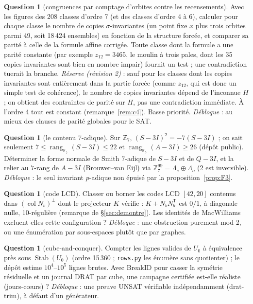 \documentclass[11pt,a4paper]{article}
\theoremstyle{definition}
\newtheorem{question}[theorem]{Question}
\theoremstyle{remark}
\newcommand{\F}{\mathbb{F}}
\newcommand{\Z}{\mathbb{Z}}
\newcommand{\rg}{\operatorname{rang}}
\newcommand{\code}[1]{\texttt{#1}}
\begin{document}
\begin{question}[congruences par comptage d'orbites contre les recensements]\label{q:parite}
Avec les figures des 208 classes d'ordre 7 (et des classes d'ordre 4 à 6), calculer pour chaque classe le nombre de copies $\sigma$-invariantes (un point fixe $x$ plus trois orbites parmi 49, soit 18\,424 ensembles) en fonction de la structure forcée, et comparer sa parité à celle de la formule affine corrigée. Toute classe dont la formule a une parité constante (par exemple $z_{12}=3465$, le moulin à trois pales, dont les 35 copies invariantes sont bien en nombre impair) fournit un test ; une contradiction tuerait la branche. \emph{Réserve (révision 2)} : sauf pour les classes dont les copies invariantes sont entièrement dans la partie forcée (comme $z_{12}$, qui est donc un simple test de cohérence), le nombre de copies invariantes dépend de l'inconnue $H$ ; on obtient des contraintes de parité sur $H$, pas une contradiction immédiate. À l'ordre 4 tout est constant (remarque~\ref{rem:c4}). Basse priorité. \emph{Débloque} : au mieux des clauses de parité globales pour le SAT.
\end{question}

\begin{question}[le contenu $7$-adique]\label{q:7}
Sur $\Z_7$, $(S-3I)^2=-7(S-3I)$ ; on sait seulement $7\le\rg_{\F_7}(S-3I)\le22$ et $\rg_{\F_7}(A-3I)\ge26$ (dépôt public). Déterminer la forme normale de Smith $7$-adique de $S-3I$ et de $Q-3I$, et la relier au $7$-rang de $A-3I$ (Brouwer--van Eijl) via $\Z_7^{99}=\Lambda_e\oplus\Lambda_o$ (2 est inversible). \emph{Débloque} : le seul invariant $p$-adique non épuisé par la proposition~\ref{prop:F3}.
\end{question}

\begin{question}[code LCD]\label{q:code}
Classer ou borner les codes LCD $[42,20]$ contenus dans $(\operatorname{col}N_b)^\perp$ dont le projecteur $K$ vérifie : $K+N_bN_b^{\mathsf T}$ est $0/1$, à diagonale nulle, 10-régulière (remarque de §\ref{sec:demontre}). Les identités de MacWilliams excluent-elles cette configuration ? \emph{Débloque} : une obstruction purement mod 2, ou une énumération par sous-espaces plutôt que par graphes.
\end{question}

\begin{question}[cube-and-conquer]\label{q:cube}
Compter les lignes valides de $U_0$ à équivalence près sous $\operatorname{Stab}(U_0)$ (ordre 15\,360 ; \code{rows.py} les énumère sans quotienter) ; le dépôt estime $10^4$--$10^5$ lignes brutes. Avec BreakID pour casser la symétrie résiduelle et un journal DRAT par cube, une campagne certifiée est-elle réaliste (jours-cœurs) ? \emph{Débloque} : une preuve UNSAT vérifiable indépendamment (drat-trim), à défaut d'un générateur.
\end{question}
\end{document}
